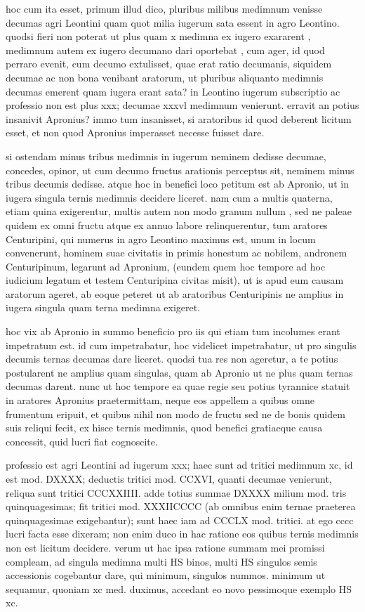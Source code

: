  hoc cum ita esset, primum illud dico, pluribus milibus medimnum venisse decumas agri Leontini quam quot milia iugerum sata essent in agro Leontino. quodsi fieri non poterat ut plus quam x medimna ex iugero exararent , medimnum autem ex iugero decumano dari oportebat , cum ager, id quod perraro evenit, cum decumo extulisset, quae erat ratio decumanis, siquidem decumae ac non bona venibant aratorum, ut pluribus aliquanto medimnis decumas emerent quam iugera erant sata? in Leontino iugerum subscriptio ac professio non est plus xxx; decumae xxxvl medimnum venierunt. erravit an potius insanivit Apronius? immo tum insanisset, si aratoribus id quod deberent licitum esset, et non quod Apronius imperasset necesse fuisset dare.

 si ostendam minus tribus medimnis in iugerum neminem dedisse decumae, concedes, opinor, ut cum decumo fructus arationis perceptus sit, neminem minus tribus decumis dedisse. atque hoc in benefici loco petitum est ab Apronio, ut in iugera singula ternis medimnis decidere liceret. nam cum a multis quaterna, etiam quina exigerentur, multis autem non modo granum nullum , sed ne paleae quidem ex omni fructu atque ex annuo labore relinquerentur, tum aratores Centuripini, qui numerus in agro Leontino maximus est, unum in locum convenerunt, hominem suae civitatis in primis honestum ac nobilem, andronem Centuripinum, legarunt ad Apronium, (eundem quem hoc tempore ad hoc iudicium legatum et testem Centuripina civitas misit), ut is apud eum causam aratorum ageret, ab eoque peteret ut ab aratoribus Centuripinis ne amplius in iugera singula quam terna medimna exigeret.

 hoc vix ab Apronio in summo beneficio pro iis qui etiam tum incolumes erant impetratum est. id cum impetrabatur, hoc videlicet impetrabatur, ut pro singulis decumis ternas decumas dare liceret. quodsi tua res non ageretur, a te potius postularent ne amplius quam singulas, quam ab Apronio ut ne plus quam ternas decumas darent. nunc ut hoc tempore ea quae regie seu potius tyrannice statuit in aratores Apronius praetermittam, neque eos appellem a quibus omne frumentum eripuit, et quibus nihil non modo de fructu sed ne de bonis quidem suis reliqui fecit, ex hisce ternis medimnis, quod benefici gratiaeque causa concessit, quid lucri fiat cognoscite.

 professio est agri Leontini ad iugerum xxx; haec sunt ad tritici medimnum xc, id est mod. DXXXX; deductis tritici mod. CCXVI, quanti decumae venierunt, reliqua sunt tritici CCCXXIIII. adde totius summae DXXXX milium mod. tris quinquagesimas; fit tritici mod. XXXIICCCC (ab omnibus enim ternae praeterea quinquagesimae exigebantur); sunt haec iam ad CCCLX mod. tritici. at ego cccc lucri facta esse dixeram; non enim duco in hac ratione eos quibus ternis medimnis non est licitum decidere. verum ut hac ipsa ratione summam mei promissi compleam, ad singula medimna multi HS binos, multi HS singulos semis accessionis cogebantur dare, qui minimum, singulos nummos. minimum ut sequamur, quoniam xc med. duximus, accedant eo novo pessimoque exemplo HS xc.

